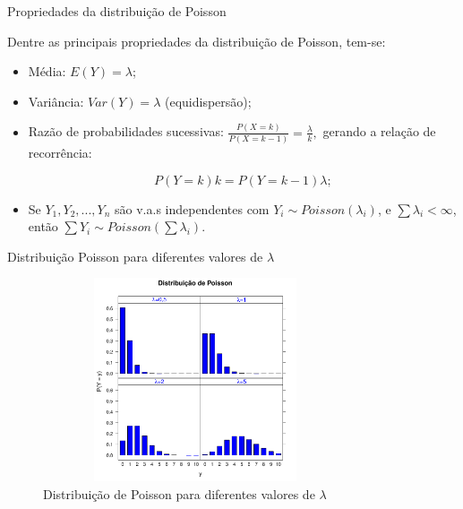 \documentclass[10pt, aspectratio=169]{beamer}
\begin{document}
\begin{frame}{Propriedades da distribuição de Poisson}

Dentre as principais propriedades da distribuição de Poisson, tem-se:

\vspace{0,3cm}

\begin{itemize}

    \item Média: $E(Y)= \lambda$;
    \vspace{0,5cm}
    
    \item Variância: $Var(Y)=\lambda$ (equidispersão);
    \vspace{0,5cm}
    
    \item Razão de probabilidades sucessivas: $\frac{P\left ( X=k \right )}{P\left ( X=k-1 \right )}=\frac{\lambda}{k},$ gerando a relação de recorrência:
    
    $$
        P(Y=k)k=P(Y=k-1)\lambda;
    $$
    
    \item Se $Y_{1},Y_{2},...,Y_{n}$ são v.a.s independentes com $Y_{i}\sim Poisson(\lambda_{i})$, e $\sum\lambda_{i}<\infty$, então $\sum Y_{i}\sim Poisson(\sum\lambda_{i})$.
    
    \end{itemize}
\end{frame}



\begin{frame}{Distribuição Poisson para diferentes valores de $\lambda$}
    
    \begin{figure}[h]
    \includegraphics[height=6cm,width=9cm]{images/Graf_Poisson.pdf}
    \caption{Distribuição de Poisson para diferentes valores de $\lambda$}
    \label{Fig1}
    \centering
    
\end{figure}
\end{frame}
\end{document}

